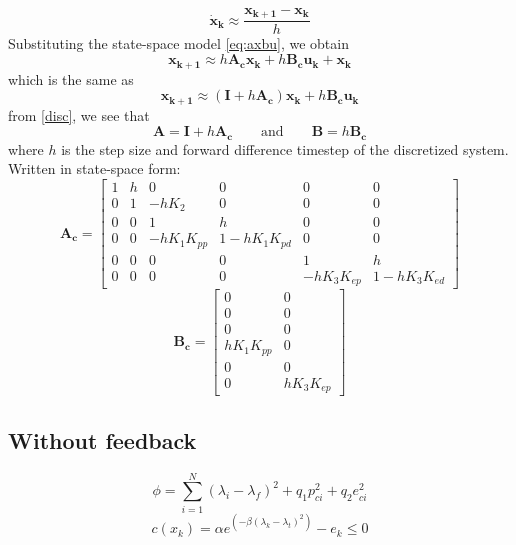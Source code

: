 \documentclass[11pt,a4paper,USenglish]{article} %
\begin{document}
\begin{equation}
    \mathbf{\dot{x}_k} \approx \frac{\mathbf{x_{k+1}} - \mathbf{x_k}}{h}
\end{equation}
Substituting the state-space model \eqref{eq:axbu}, we obtain
\begin{equation}
    \mathbf{x_{k+1}} \approx h\mathbf{A_{c}}\mathbf{x_{k}}+h\mathbf{B_{c}}\mathbf{u_{k}+\mathbf{x_{k}}}
    \label{discrete}
\end{equation}
which is the same as
\begin{equation}
    \mathbf{x_{k+1}} \approx (\mathbf{I} + h\mathbf{A_c}) \mathbf{x_k} + h\mathbf{B_c} \mathbf{u_k}
    \label{disc}
\end{equation}
from \eqref{disc}, we see that
\begin{equation}
    \mathbf{A} = \mathbf{I} + h\mathbf{A_c}
    \qquad\text{and}\qquad
    \mathbf{B} = h\mathbf{B_c}
\end{equation}
where $h$ is the step size and forward difference timestep of the discretized system.
Written in state-space form: 
\begin{equation}
    \mathbf{A_c} = \begin{bmatrix} 
    1 & h & 0 & 0 & 0 & 0 \\ 
    0 & 1 & -hK_2 & 0 & 0 & 0 \\ 
    0 & 0 & 1 & h & 0 & 0 \\ 
    0 & 0 & -hK_1K_{pp} & 1-hK_1K_{pd} & 0 & 0 \\ 
    0 & 0 & 0 & 0 & 1 & h \\ 
    0 & 0 & 0 & 0 & -hK_{3}K_{ep} & 1-hK_{3}K_{ed}
\end{bmatrix}
\end{equation}
\begin{equation}
    \mathbf{B_c} = \begin{bmatrix}0 & 0 \\ 0 & 0 \\ 0 & 0 \\ hK_1K_{pp} & 0 \\ 0 & 0 \\ 0 &  hK_{3}K_{ep} \end{bmatrix}
    \label{eq:ssdisc}
\end{equation}



\subsection{Without feedback}
\begin{equation}
\label{eq:min104}
\phi = \sum_{i=1}^N(\lambda_i - \lambda_f)^2 + q_1p^2_{ci}+q_2e^2_{ci}
\end{equation}
\begin{equation}
c(x_k)= \alpha e^(-\beta(\lambda_k-\lambda_t)^2) - e_k \leq 0
\end{equation}
\end{document}
